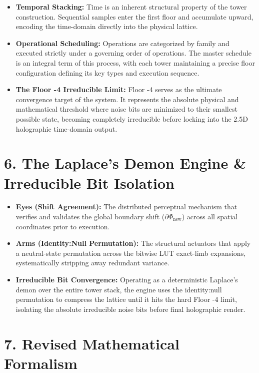 \begin{itemize}
\item \textbf{Temporal Stacking:} Time is an inherent structural property of the tower construction. Sequential samples enter the first floor and accumulate upward, encoding the time-domain directly into the physical lattice.
\item \textbf{Operational Scheduling:} Operations are categorized by family and executed strictly under a governing order of operations. The master schedule is an integral term of this process, with each tower maintaining a precise floor configuration defining its key types and execution sequence.
\item \textbf{The Floor -4 Irreducible Limit:} Floor -4 serves as the ultimate convergence target of the system. It represents the absolute physical and mathematical threshold where noise bits are minimized to their smallest possible state, becoming completely irreducible before locking into the 2.5D holographic time-domain output.
\end{itemize}

\medskip

\section{\texorpdfstring{6. The Laplace’s Demon Engine \& Irreducible Bit Isolation}{6. The Laplace’s Demon Engine \& Irreducible Bit Isolation}}

\begin{itemize}
\item \textbf{Eyes (Shift Agreement):} The distributed perceptual mechanism that verifies and validates the global boundary shift (\(\partial\Phi_{\text{new}}\)) across all spatial coordinates prior to execution.
\item \textbf{Arms (Identity:Null Permutation):} The structural actuators that apply a neutral-state permutation across the bitwise LUT exact-limb expansions, systematically stripping away redundant variance.
\item \textbf{Irreducible Bit Convergence:} Operating as a deterministic Laplace’s demon over the entire tower stack, the engine uses the identity:null permutation to compress the lattice until it hits the hard Floor -4 limit, isolating the absolute irreducible noise bits before final holographic render.
\end{itemize}

\medskip

\section{\texorpdfstring{7. Revised Mathematical Formalism}{7. Revised Mathematical Formalism}}

